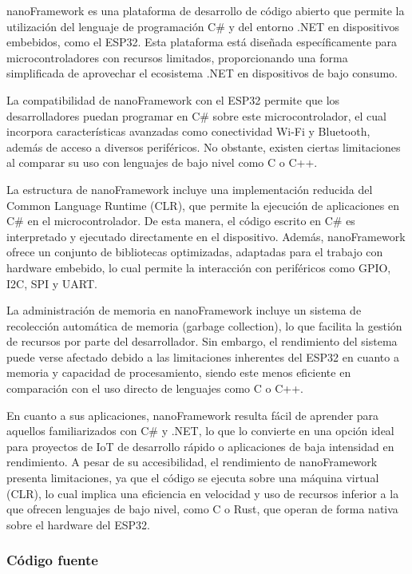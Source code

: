 nanoFramework \citep{nanoframework} es una plataforma de desarrollo de código abierto que permite la utilización del lenguaje de programación C\# y del entorno .NET en dispositivos embebidos, como el ESP32. Esta plataforma está diseñada específicamente para microcontroladores con recursos limitados, proporcionando una forma simplificada de aprovechar el ecosistema .NET en dispositivos de bajo consumo.

La compatibilidad de nanoFramework con el ESP32 permite que los desarrolladores puedan programar en C\# sobre este microcontrolador, el cual incorpora características avanzadas como conectividad Wi-Fi y Bluetooth, además de acceso a diversos periféricos. No obstante, existen ciertas limitaciones al comparar su uso con lenguajes de bajo nivel como C o C++.

La estructura de nanoFramework incluye una implementación reducida del Common Language Runtime (CLR), que permite la ejecución de aplicaciones en C\# en el microcontrolador. De esta manera, el código escrito en C\# es interpretado y ejecutado directamente en el dispositivo. Además, nanoFramework ofrece un conjunto de bibliotecas optimizadas, adaptadas para el trabajo con hardware embebido, lo cual permite la interacción con periféricos como GPIO, I2C, SPI y UART.

La administración de memoria en nanoFramework incluye un sistema de recolección automática de memoria (garbage collection), lo que facilita la gestión de recursos por parte del desarrollador. Sin embargo, el rendimiento del sistema puede verse afectado debido a las limitaciones inherentes del ESP32 en cuanto a memoria y capacidad de procesamiento, siendo este menos eficiente en comparación con el uso directo de lenguajes como C o C++.

En cuanto a sus aplicaciones, nanoFramework resulta fácil de aprender para aquellos familiarizados con C\# y .NET, lo que lo convierte en una opción ideal para proyectos de IoT de desarrollo rápido o aplicaciones de baja intensidad en rendimiento. A pesar de su accesibilidad, el rendimiento de nanoFramework presenta limitaciones, ya que el código se ejecuta sobre una máquina virtual (CLR), lo cual implica una eficiencia en velocidad y uso de recursos inferior a la que ofrecen lenguajes de bajo nivel, como C o Rust, que operan de forma nativa sobre el hardware del ESP32.

\subsubsection{Código fuente}

